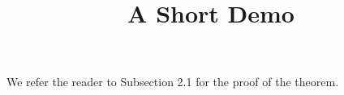\documentclass[article]{jss}
\title{A Short Demo}
\begin{document}
We refer the reader to Subsection 2.1 for the proof of the theorem.
\end{document}
